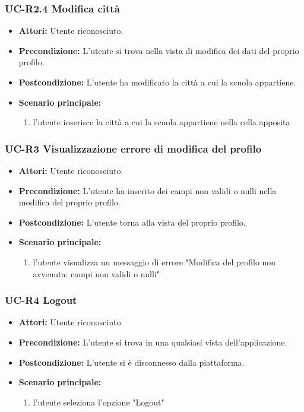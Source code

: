 \subsubsection{UC-R2.4 Modifica città}
\begin{itemize}
			\item \textbf{Attori:} Utente riconosciuto.
			\item \textbf{Precondizione:} L'utente si trova nella vista di modifica dei dati del proprio profilo.
			\item \textbf{Postcondizione:} L'utente ha modificato la città a cui la scuola appartiene.
			\item \textbf{Scenario principale:}
			\begin{enumerate}
				\item l'utente inserisce la città a cui la scuola appartiene nella cella apposita
			\end{enumerate}
\end{itemize}

\subsubsection{UC-R3 Visualizzazione errore di modifica del profilo}	
	\begin{itemize}
		\item \textbf{Attori:} Utente riconosciuto.
		\item \textbf{Precondizione:} L'utente ha inserito dei campi non validi o nulli nella modifica del proprio profilo.
		\item \textbf{Postcondizione:} L'utente torna alla vista del proprio profilo.
		\item \textbf{Scenario principale:}
		\begin{enumerate}
			\item l'utente visualizza un messaggio di errore "Modifica del profilo non avvenuta: campi non validi o nulli"
		\end{enumerate}
	\end{itemize}

\subsubsection{UC-R4 Logout}
\begin{itemize}
		\item \textbf{Attori:} Utente riconosciuto.
		\item \textbf{Precondizione:} L'utente si trova in una qualsiasi vista dell'applicazione.
		\item \textbf{Postcondizione:} L'utente si è disconnesso dalla piattaforma.
		\item \textbf{Scenario principale:}
		\begin{enumerate}
			\item l'utente seleziona l'opzione "Logout"
		\end{enumerate}
	\end{itemize}

